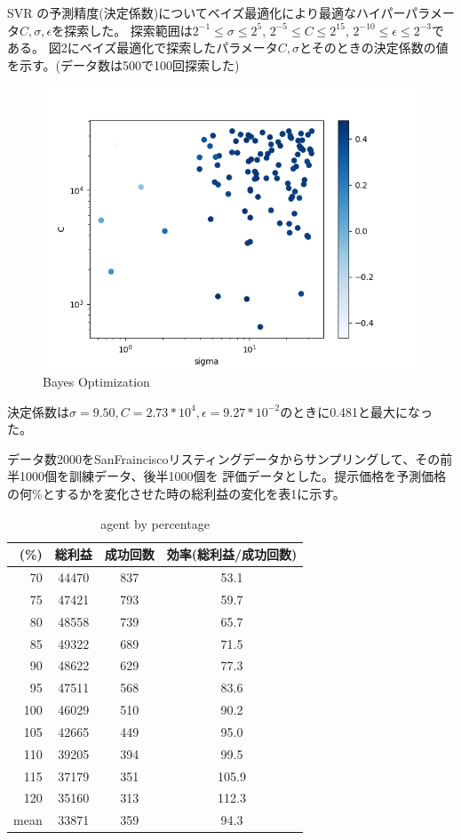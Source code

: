 \documentclass{jsarticle}
\begin{document}
SVR の予測精度(決定係数)についてベイズ最適化により最適なハイパーパラメータ$C, \sigma, \epsilon$を探索した。
探索範囲は$2^{-1} \leq \sigma \leq 2^5$, $2^{-5} \leq C \leq 2^{15}$, $2^{-10} \leq \epsilon \leq 2^{-3}$である。
図2にベイズ最適化で探索したパラメータ$C, \sigma$とそのときの決定係数の値を示す。(データ数は500で100回探索した)
\begin{figure}[H]
\includegraphics[width=15cm]{bayes_opt.png}
\caption{Bayes Optimization}
\end{figure}
決定係数は$\sigma = 9.50, C = 2.73 * 10^4, \epsilon = 9.27 * 10^{-2}$のときに0.481と最大になった。

データ数2000をSanFrainciscoリスティングデータからサンプリングして、その前半1000個を訓練データ、後半1000個を
評価データとした。提示価格を予測価格の何\%とするかを変化させた時の総利益の変化を表1に示す。
\begin{table}[H]
    \centering
    \begin{tabular}{|r||c|c|c|} \hline
      (\%) & 総利益 & 成功回数 & 効率(総利益/成功回数) \\ \hline
      70 & 44470 & 837 & 53.1 \\
      75 & 47421 & 793 & 59.7 \\
      80 & 48558 & 739 & 65.7 \\
      85 & 49322 & 689 & 71.5 \\
      90 & 48622 & 629 & 77.3 \\
      95 & 47511 & 568 & 83.6 \\
      100 & 46029 & 510 & 90.2 \\
      105 & 42665 & 449 & 95.0 \\
      110 & 39205 & 394 & 99.5 \\
      115 & 37179 & 351 & 105.9 \\
      120 & 35160 & 313 & 112.3 \\ \hline
      mean & 33871 & 359 & 94.3 \\ \hline
    \end{tabular}
    \caption{agent by percentage}
\end{table}
\end{document}
